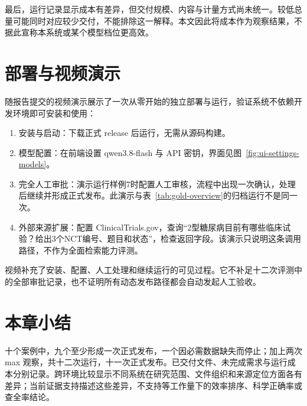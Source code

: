 最后，运行记录显示成本有差异，但交付规模、内容与计量方式尚未统一。较低总量可能同时对应较少交付，不能排除这一解释。本文因此将成本作为观察结果，不据此宣称本系统或某个模型档位更高效。

\section{部署与视频演示}\label{sec:video-demo}

随报告提交的视频演示展示了一次从零开始的独立部署与运行，验证系统不依赖开发环境即可安装和使用：

\begin{enumerate}
  \item 安装与启动：下载正式 release 后运行，无需从源码构建。
  \item 模型配置：在前端设置 qwen3.8-flash 与 API 密钥，界面见图~\ref{fig:ui-settings-models}。
  \item 完全人工审批：演示运行样例7时配置人工审核，流程中出现一次确认，处理后继续并形成正式发布。此演示与表~\ref{tab:gold-overview}的归档运行不是同一次。
  \item 外部来源扩展：配置 ClinicalTrials.gov，查询“2型糖尿病目前有哪些临床试验？给出3个NCT编号、题目和状态”，检查返回字段。该演示只说明这条调用路径，不作为全面检索能力评测。
\end{enumerate}

视频补充了安装、配置、人工处理和继续运行的可见过程。它不补足十二次评测中的全部审批记录，也不证明所有动态发布路径都会自动发起人工验收。

\section{本章小结}

十个案例中，九个至少形成一次正式发布，一个因必需数据缺失而停止；加上两次 max 观察，共十二次运行，十一次正式发布。已交付文件、未完成需求与运行成本分别记录。跨环境比较显示不同系统在研究范围、文件组织和来源定位方面各有差异；当前证据支持描述这些差异，不支持等工作量下的效率排序、科学正确率或查全率结论。
